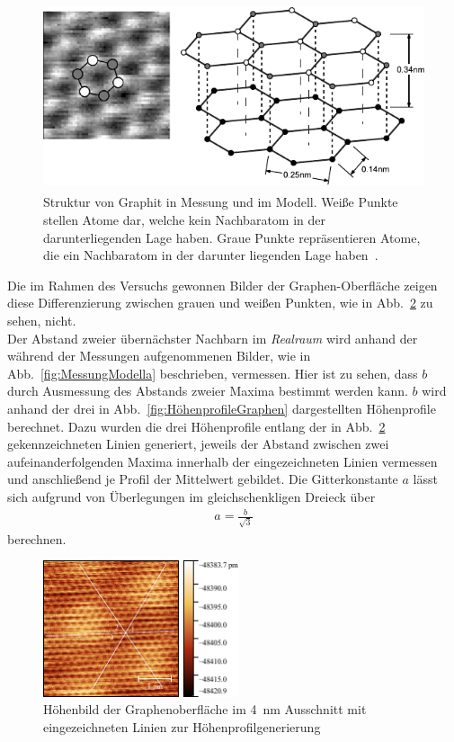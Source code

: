 \documentclass[a4paper,twoside,final]{article}
\begin{document}
\begin{figure}[htp]
    \centering
      \includegraphics[height=5.5cm]{Bilder/Gitterstruktur_Graphen.pdf}
    \caption{Struktur von Graphit in Messung und im Modell. Weiße Punkte stellen Atome dar, welche kein Nachbaratom in der darunterliegenden Lage haben. Graue Punkte repräsentieren Atome, die ein Nachbaratom in der darunter liegenden Lage haben~\cite{Nanosurf}.}
    \label{fig:Graphit}
\end{figure}

Die im Rahmen des Versuchs gewonnen Bilder der Graphen-Oberfläche zeigen diese Differenzierung zwischen grauen und weißen Punkten, wie in Abb.~\ref{fig:STMBildGraphen} zu sehen, nicht.\\
Der Abstand zweier übernächster Nachbarn im \textit{Realraum} wird anhand der während der Messungen aufgenommenen Bilder, wie in Abb.~\ref{fig:MessungModella} beschrieben, vermessen. Hier ist zu sehen, dass $b$ durch Ausmessung des Abstands zweier Maxima bestimmt werden kann. $b$ wird anhand der drei in Abb.~\ref{fig:HöhenprofileGraphen} dargestellten Höhenprofile berechnet. Dazu wurden die drei Höhenprofile entlang der in Abb.~\ref{fig:STMBildGraphen} gekennzeichneten Linien generiert, jeweils der Abstand zwischen zwei aufeinanderfolgenden Maxima innerhalb der eingezeichneten Linien vermessen und anschließend je Profil der Mittelwert gebildet. Die Gitterkonstante $a$ lässt sich aufgrund von Überlegungen im gleichschenkligen Dreieck über
\begin{align}\label{equ:a}
  a = \frac{b}{\sqrt{3}}
\end{align}
berechnen.
\begin{figure}[ht]
  \centering
    \includegraphics[height = 4cm]{Bilder/Image02001mitHoehenlinien.pdf}
    \caption{Höhenbild der Graphenoberfläche im \SI{4}{\nano\meter} Ausschnitt mit eingezeichneten Linien zur Höhenprofilgenerierung}
    \label{fig:STMBildGraphen}
\end{figure}
\end{document}
